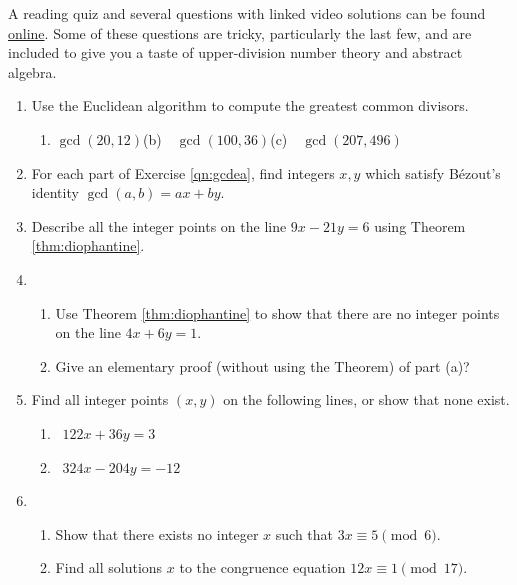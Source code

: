 \begin{exercises}{}{}
	A reading quiz and several questions with linked video solutions can be found \href{http://www.math.uci.edu/~ndonalds/math13/selftest/3-2-euclidalg.html}{online}. Some of these questions are tricky, particularly the last few, and are included to give you a taste of upper-division number theory and abstract algebra.

	\begin{enumerate}
	  \item\label{qn:gcdea} Use the Euclidean algorithm to compute the greatest common divisors.
	  \begin{enumerate}
	    \item $\gcd(20,12)$\qquad (b)\ \ $\gcd(100,36)$\qquad (c)\ \ $\gcd(207,496)$
	  \end{enumerate} 
	  
	  \item For each part of Exercise \ref*{qn:gcdea}, find integers $x,y$ which satisfy Bézout's identity $\gcd(a,b)=ax+by$.
	  
	  \item Describe all the integer points on the line $9x-21y=6$ using Theorem \ref{thm:diophantine}.
	  
	  
	  \item\begin{enumerate}
	    \item Use Theorem \ref{thm:diophantine} to show that there are no integer points on the line $4x+6y=1$.
	  	\item Give an elementary proof (without using the Theorem) of part (a)?
	  \end{enumerate} 
	  
		\item Find all integer points $(x,y)$ on the following lines, or show that none exist.
	    \begin{enumerate}
	      \item {} \ $122x+36y=3$
	      \setcounter{enumii}{2}
	      \item {} \ $324x-204y=-12$
	    \end{enumerate}
	  
	  \item\begin{enumerate}
	    \item Show that there exists no integer $x$ such that $3x\equiv 5\pmod 6$.
	    \item Find all solutions $x$ to the congruence equation $12x\equiv 1\pmod{17}$.
	  \end{enumerate} 
	    

\end{enumerate}
\end{exercises}
